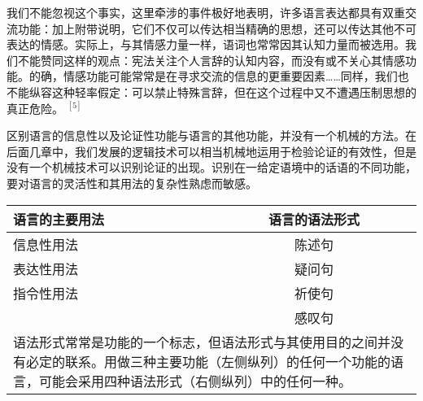 \begin{displayquote}
我们不能忽视这个事实，这里牵涉的事件极好地表明，许多语言表达都具有双重交流功能：加上附带说明，它们不仅可以传达相当精确的思想，还可以传达其他不可表达的情感。实际上，与其情感力量一样，语词也常常因其认知力量而被选用。我们不能赞同这样的观点：宪法关注个人言辞的认知内容，而没有或不关心其情感功能。的确，情感功能可能常常是在寻求交流的信息的更重要因素……同样，我们也不能纵容这种轻率假定：可以禁止特殊言辞，但在这个过程中又不遭遇压制思想的真正危险。 ${ }^{[5]}$
\end{displayquote}

区别语言的信息性以及论证性功能与语言的其他功能，并没有一个机械的方法。在后面几章中，我们发展的逻辑技术可以相当机械地运用于检验论证的有效性，但是没有一个机械技术可以识别论证的出现。识别在一给定语境中的话语的不同功能，要对语言的灵活性和其用法的复杂性熟虑而敏感。

\begin{center}
\begin{tabular}{|l|c|}
\hline
\textbf{语言的主要用法} & \textbf{语言的语法形式} \\
\hline
信息性用法 & 陈述句 \\
\hline
表达性用法 & 疑问句 \\
\hline
指令性用法 & 祈使句 \\
\hline
 & 感叹句 \\
\hline
\multicolumn{2}{|p{0.8\textwidth}|}{语法形式常常是功能的一个标志，但语法形式与其使用目的之间并没有必定的联系。用做三种主要功能（左侧纵列）的任何一个功能的语言，可能会采用四种语法形式（右侧纵列）中的任何一种。} \\
\hline
\end{tabular}
\end{center}


